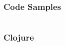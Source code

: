 \documentclass{beamer}
\begin{document}
\begin{frame}
  \frametitle{Code Samples} 
  \inputminted{clojure}{src/xml-parse.clj}
\end{frame}  

\begin{frame}
  \frametitle{Clojure}

\end{frame}

\end{document}
